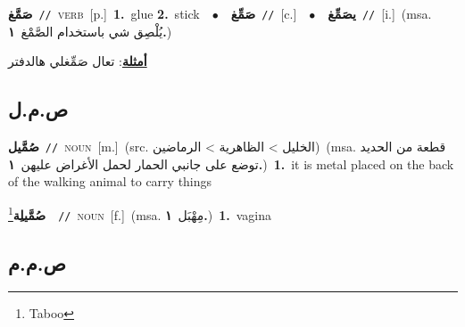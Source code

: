 \documentclass[10pt,a4paper,twoside]{article} %
\begin{document}
\begin{multicols}{2}
{\setlength\topsep{0pt}\textbf{\foreignlanguage{arabic}{صَمَّغ}}\ {\color{gray}\texttt{//}\color{black}}\ \textsc{verb}\ [p.]\ \textbf{1.}~glue  \textbf{2.}~stick\ \ $\bullet$\ \ \setlength\topsep{0pt}\textbf{\foreignlanguage{arabic}{صَمِّغ}}\ {\color{gray}\texttt{//}\color{black}}\ [c.]\ \ $\bullet$\ \ \setlength\topsep{0pt}\textbf{\foreignlanguage{arabic}{يصَمِّغ}}\ {\color{gray}\texttt{//}\color{black}}\ [i.]\ \color{gray}(msa. \foreignlanguage{arabic}{يُلْصِق شي باستخدام الصَّمْغ}~\foreignlanguage{arabic}{\textbf{١.}})\color{black}\  \begin{flushright}\color{gray}\foreignlanguage{arabic}{\textbf{\underline{\foreignlanguage{arabic}{أمثلة}}}: تعال صَمِّغلي هالدفتر}\end{flushright}\color{black}} \vspace{2mm}

\vspace{-3mm}
\subsection*{\color{blue}\foreignlanguage{arabic}{ص.م.ل}\color{blue}{}} 

{\setlength\topsep{0pt}\textbf{\foreignlanguage{arabic}{صُمَّيل}}\ {\color{gray}\texttt{//}\color{black}}\ \textsc{noun}\ [m.]\ (src. \color{gray}\foreignlanguage{arabic}{الخليل > الظاهرية > الرماضين}\color{black})\ \color{gray}(msa. \foreignlanguage{arabic}{قطعة من الحديد توضع على جانبي الحمار لحمل الأغراض عليهن}~\foreignlanguage{arabic}{\textbf{١.}})\color{black}\ \textbf{1.}~it is metal placed on the back of the walking animal to carry things\ } \vspace{2mm}

{\setlength\topsep{0pt}\textbf{\foreignlanguage{arabic}{صُمَّيلِة}}\footnote{Taboo}\ \ {\color{gray}\texttt{//}\color{black}}\ \textsc{noun}\ [f.]\ \color{gray}(msa. \foreignlanguage{arabic}{مِهْبَل}~\foreignlanguage{arabic}{\textbf{١.}})\color{black}\ \textbf{1.}~vagina\ } \vspace{2mm}

\vspace{-3mm}
\subsection*{\color{blue}\foreignlanguage{arabic}{ص.م.م}\color{blue}{}} 


\end{multicols}
\end{document}
